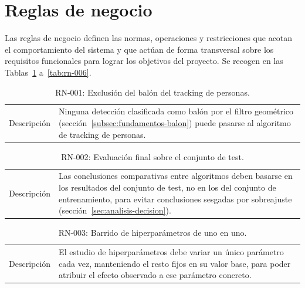 \section{Reglas de negocio}
\label{sec:analisis-rn}

Las reglas de negocio definen las normas, operaciones y restricciones que acotan el comportamiento
del sistema y
que actúan de forma transversal sobre los requisitos funcionales para lograr los objetivos del proyecto. Se recogen en las
Tablas~\ref{tab:rn-001} a~\ref{tab:rn-006}.

\begin{table}[htp]
\centering
\caption{RN-001: Exclusión del balón del tracking de personas.}
\label{tab:rn-001}
\renewcommand{\arraystretch}{1.2}
\begin{tabular}{|p{3.1cm}|p{9.2cm}|}
\hline
\rowcolor{gray!25}
\multicolumn{2}{|l|}{\textbf{RN-001 -- Exclusión del balón del tracking de personas}} \\
\hline
Descripción & Ninguna detección clasificada como balón por el filtro
  geométrico (sección~\ref{subsec:fundamentos-balon}) puede pasarse al
  algoritmo de tracking de personas. \\
\hline
\end{tabular}
\end{table}

\begin{table}[htp]
\centering
\caption{RN-002: Evaluación final sobre el conjunto de test.}
\label{tab:rn-002}
\renewcommand{\arraystretch}{1.2}
\begin{tabular}{|p{3.1cm}|p{9.2cm}|}
\hline
\rowcolor{gray!25}
\multicolumn{2}{|l|}{\textbf{RN-002 -- Evaluación final sobre el conjunto de test}} \\
\hline
Descripción & Las conclusiones comparativas entre algoritmos deben basarse
  en los resultados del conjunto de test, no en los del conjunto de
  entrenamiento, para evitar conclusiones sesgadas por sobreajuste
  (sección~\ref{sec:analisis-decision}). \\
\hline
\end{tabular}
\end{table}

\begin{table}[htp]
\centering
\caption{RN-003: Barrido de hiperparámetros de uno en uno.}
\label{tab:rn-003}
\renewcommand{\arraystretch}{1.2}
\begin{tabular}{|p{3.1cm}|p{9.2cm}|}
\hline
\rowcolor{gray!25}
\multicolumn{2}{|l|}{\textbf{RN-003 -- Barrido de hiperparámetros de uno en uno}} \\
\hline
Descripción & El estudio de hiperparámetros debe variar un único parámetro
  cada vez, manteniendo el resto fijos en su valor base, para poder
  atribuir el efecto observado a ese parámetro concreto. \\
\hline
\end{tabular}
\end{table}

